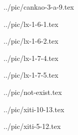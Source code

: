../pic/cankao-3-a-9.tex



../pic/lx-1-6-1.tex



../pic/lx-1-6-2.tex



../pic/lx-1-7-4.tex



../pic/lx-1-7-5.tex



../pic/not-exist.tex



../pic/xiti-10-13.tex



../pic/xiti-5-12.tex

